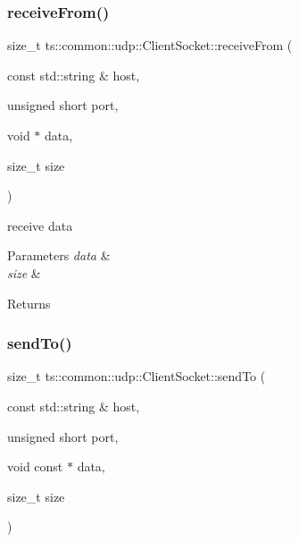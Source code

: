 \subsubsection{\texorpdfstring{receive\+From()}{receiveFrom()}}
{\footnotesize\ttfamily size\+\_\+t ts\+::common\+::udp\+::\+Client\+Socket\+::receive\+From (\begin{DoxyParamCaption}\item[{const std\+::string \&}]{host,  }\item[{unsigned short}]{port,  }\item[{void $\ast$}]{data,  }\item[{size\+\_\+t}]{size }\end{DoxyParamCaption})}

receive data 
\begin{DoxyParams}{Parameters}
{\em data} & \\
\hline
{\em size} & \\
\hline
\end{DoxyParams}
\begin{DoxyReturn}{Returns}

\end{DoxyReturn}
\mbox{\label{classts_1_1common_1_1udp_1_1_client_socket_a21b35f111813fe20dcd40f40c12c0f29}} 
\subsubsection{\texorpdfstring{send\+To()}{sendTo()}}
{\footnotesize\ttfamily size\+\_\+t ts\+::common\+::udp\+::\+Client\+Socket\+::send\+To (\begin{DoxyParamCaption}\item[{const std\+::string \&}]{host,  }\item[{unsigned short}]{port,  }\item[{void const $\ast$}]{data,  }\item[{size\+\_\+t}]{size }\end{DoxyParamCaption})}

